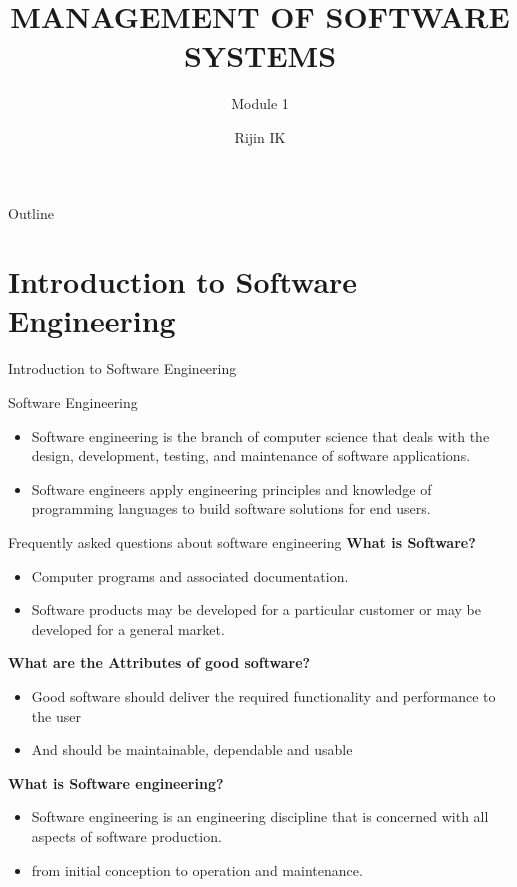 \documentclass{beamer}
\title[CST 309 M1]{MANAGEMENT OF SOFTWARE SYSTEMS}
\subtitle{Module 1}
\author{Rijin IK}
\institute[VJEC]{Assistant Professor\\Department of Computer Science and Engineering\\Vimal Jyothi Engineering College\\Chemperi}
\begin{document}
	\begin{frame}
		\titlepage
	\end{frame}
   \begin{frame}{Outline}
   \tableofcontents
   \end{frame}
\section{Introduction to Software Engineering}
\begin{frame}{Introduction to Software Engineering}
\begin{block}{Software Engineering}
	\begin{itemize}
		\item Software engineering is the branch of computer science that deals with the design, development, testing, and maintenance of software applications.
		\item Software engineers apply engineering principles and knowledge of programming languages to build software solutions for end users.
	\end{itemize}
\end{block}
\end{frame}
\begin{frame}{Frequently 
		asked questions about 
		software engineering}
\textbf{What is Software?}
\begin{itemize}
	\item Computer programs and associated 
	documentation.
	\item Software products may be 
	developed for a particular customer or 
	may be developed for a general market.
\end{itemize}
\textbf{What are the Attributes of good software?}
\begin{itemize}
	\item Good software should deliver the required 
	functionality and performance to the user 
	\item And should be maintainable, dependable 
	and usable
\end{itemize}
\textbf{What is Software engineering?}
\begin{itemize}
	\item Software engineering is an engineering 
	discipline that is concerned with all 
	aspects of software production.
	\item  from initial conception to 
	operation and maintenance.
\end{itemize}
\end{frame}
\end{document}

